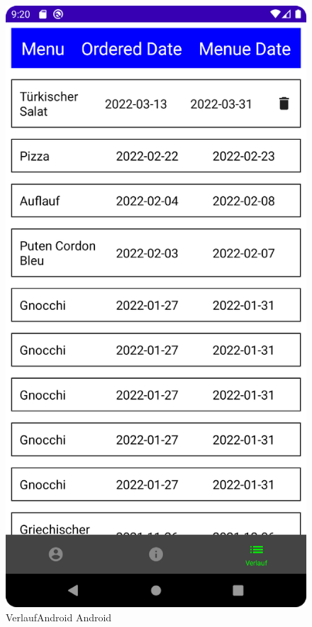 \begin{figure}[htp]
    \centering
    \author{Bozidar Spasenovic}
    \includegraphics[scale=0.09]{pics/VerlaufAndroid.png}
    \caption{VerlaufAndroid Android}
    \label{fig:impl:VerlaufAndroid}
\end{figure}


